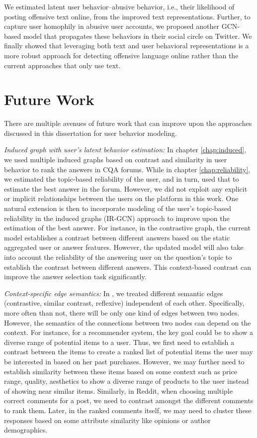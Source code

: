 We estimated latent user behavior--abusive behavior, i.e., their likelihood of posting offensive text online, from the improved text representations. Further, to capture user homophily in abusive user accounts, we proposed another GCN-based model that propagates these behaviors in their social circle on Twitter. We finally showed that leveraging both text and user behavioral representations is a more robust approach for detecting offensive language online rather than the current approaches that only use text.

\section{Future Work}
There are multiple avenues of future work that can improve upon the approaches discussed in this dissertation for user behavior modeling.

\emph{Induced graph with user's latent behavior estimation:}
In chapter \ref{chap:induced}, we used multiple induced graphs based on contrast and similarity in user behavior to rank the answers in CQA forums. While in chapter \ref{chap:reliability}, we estimated the topic-based reliability of the user, and in turn, used that to estimate the best answer in the forum. However, we did not exploit any explicit or implicit relationships between the users on the platform in this work.
One natural extension is then to incorporate modeling of the user's topic-based reliability in the induced graphs (IR-GCN) approach to improve upon the estimation of the best answer. For instance, in the contrastive graph, the current model establishes a contrast between different answers based on the static aggregated user or answer features. However, the updated model will also take into account the reliability of the answering user on the question's topic to establish the contrast between different answers. This context-based contrast can improve the answer selection task significantly.

\emph{Context-specific edge semantics:}
In , we treated different semantic edges (contrastive, similar contrast, reflexive) independent of each other. Specifically, more often than not, there will be only one kind of edges between two nodes. However, the semantics of the connections between two nodes can depend on the context. For instance, for a recommender system, the key goal could be to show a diverse range of potential items to a user. Thus, we first need to establish a contrast between the items to create a ranked list of potential items the user may be interested in based on her past purchases. However, we may further need to establish similarity between these items based on some context such as price range, quality, aesthetics to show a diverse range of products to the user instead of showing near similar items.
Similarly, in Reddit, when choosing multiple correct comments for a post, we need to contrast amongst the different comments to rank them. Later, in the ranked comments itself, we may need to cluster these responses based on some attribute similarity like opinions or author demographics.

